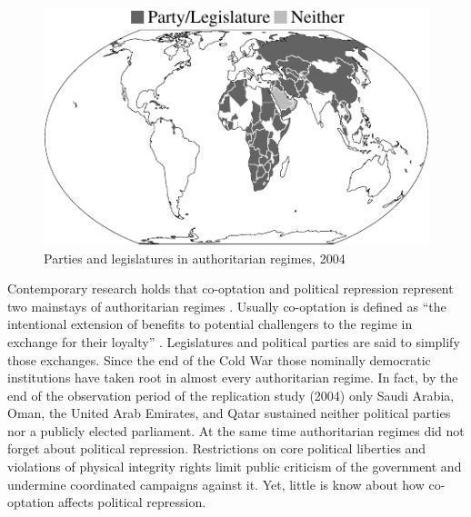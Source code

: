 \begin{figure}
\centering
\includegraphics[width=1\linewidth]{./sections/01intro/worldmapTermpaperIntro.pdf}
\caption{Parties and legislatures in authoritarian regimes, 2004}
\label{fig:worldmapIntro}
\end{figure}
Contemporary research holds that co-optation and political 
repression represent two mainstays of authoritarian regimes 
\citep[21f.]{Gerschewski.2013}. Usually co-optation 
is defined as ``the intentional extension of benefits to 
potential challengers to the regime in exchange for their 
loyalty'' \citep[333]{Frantz.2014}. Legislatures and 
political parties are said to simplify those exchanges. Since 
the end of the Cold War those nominally democratic 
institutions have taken root in almost every authoritarian 
regime. In fact, by the end of the observation period of the
replication study (2004) only Saudi Arabia, Oman, the 
United Arab Emirates, and Qatar sustained neither political 
parties nor a publicly elected parliament. At the same time 
authoritarian regimes did not forget about political 
repression. Restrictions on core political liberties 
and violations of physical integrity rights limit public 
criticism of the government and undermine coordinated 
campaigns against it. Yet, little is know about how 
co-optation affects political repression.

